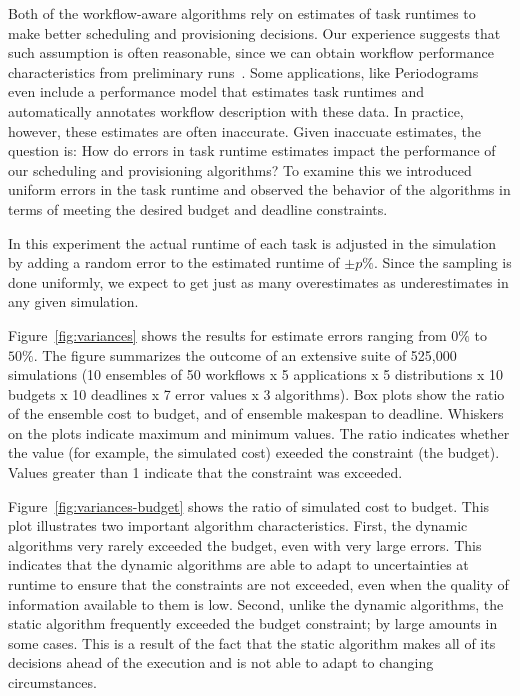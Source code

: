 \documentclass[preprint,5p]{elsarticle}
\begin{document}
Both of the workflow-aware algorithms rely on estimates of task runtimes to make
better scheduling and provisioning decisions. Our experience suggests that such
assumption is often reasonable, since we can obtain workflow performance
characteristics from preliminary runs~\cite{Bharathi2008,Deelman2005,Juve2010}.
Some applications, like Periodograms~\cite{Vockler2011} even include a
performance model that estimates task runtimes and automatically annotates
workflow description with these data. In practice, however, these
estimates are often inaccurate. Given inaccuate estimates, the question is: How
do errors in task runtime estimates impact the performance of our scheduling and
provisioning algorithms?  To examine this we introduced uniform errors in the
task runtime and observed the behavior of the algorithms in terms of meeting the
desired budget and deadline constraints.


In this experiment the actual runtime of each task is adjusted in the
simulation by adding a random error to the estimated runtime of $\pm p\%$.
Since the sampling is done uniformly, we expect to get just as many
overestimates as underestimates in any given simulation.

Figure~\ref{fig:variances} shows the results for estimate errors
ranging from $0\%$ to $50\%$. The figure summarizes the outcome of an
extensive suite of 525,000 simulations (10 ensembles of 50 workflows x 5
applications x 5 distributions x 10 budgets x 10 deadlines x 7 error values x
3 algorithms). Box plots show the ratio of the ensemble cost to
budget, and of ensemble makespan to deadline. Whiskers on the plots
indicate maximum and minimum values. The ratio indicates whether the value 
(for example, the simulated cost) exeeded the constraint (the budget). Values
greater than 1 indicate that the constraint was exceeded. 

Figure~\ref{fig:variances-budget} shows the ratio of simulated cost to budget. This
plot illustrates two important algorithm characteristics. First, the dynamic
algorithms very rarely exceeded the budget, even with very large errors. This
indicates that the dynamic algorithms are able to adapt to uncertainties at
runtime to ensure that the constraints are not exceeded, even when the quality
of information available to them is low. Second, unlike the dynamic
algorithms, the static algorithm frequently exceeded the budget constraint; by
large amounts in some cases. This is a result of the fact that the static
algorithm makes all of its decisions ahead of the execution and is not able to adapt
to changing circumstances.
\end{document}
